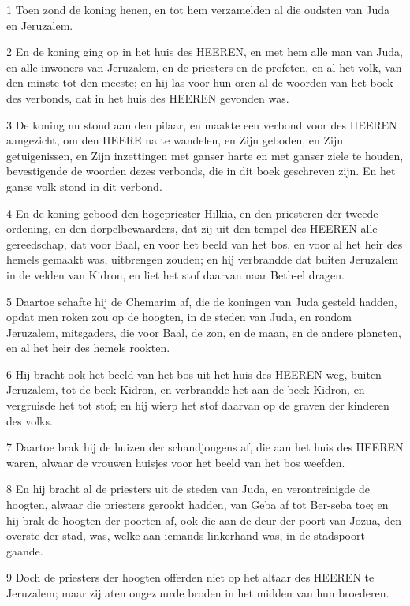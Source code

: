 \par 1 Toen zond de koning henen, en tot hem verzamelden al die oudsten van Juda en Jeruzalem.
\par 2 En de koning ging op in het huis des HEEREN, en met hem alle man van Juda, en alle inwoners van Jeruzalem, en de priesters en de profeten, en al het volk, van den minste tot den meeste; en hij las voor hun oren al de woorden van het boek des verbonds, dat in het huis des HEEREN gevonden was.
\par 3 De koning nu stond aan den pilaar, en maakte een verbond voor des HEEREN aangezicht, om den HEERE na te wandelen, en Zijn geboden, en Zijn getuigenissen, en Zijn inzettingen met ganser harte en met ganser ziele te houden, bevestigende de woorden dezes verbonds, die in dit boek geschreven zijn. En het ganse volk stond in dit verbond.
\par 4 En de koning gebood den hogepriester Hilkia, en den priesteren der tweede ordening, en den dorpelbewaarders, dat zij uit den tempel des HEEREN alle gereedschap, dat voor Baal, en voor het beeld van het bos, en voor al het heir des hemels gemaakt was, uitbrengen zouden; en hij verbrandde dat buiten Jeruzalem in de velden van Kidron, en liet het stof daarvan naar Beth-el dragen.
\par 5 Daartoe schafte hij de Chemarim af, die de koningen van Juda gesteld hadden, opdat men roken zou op de hoogten, in de steden van Juda, en rondom Jeruzalem, mitsgaders, die voor Baal, de zon, en de maan, en de andere planeten, en al het heir des hemels rookten.
\par 6 Hij bracht ook het beeld van het bos uit het huis des HEEREN weg, buiten Jeruzalem, tot de beek Kidron, en verbrandde het aan de beek Kidron, en vergruisde het tot stof; en hij wierp het stof daarvan op de graven der kinderen des volks.
\par 7 Daartoe brak hij de huizen der schandjongens af, die aan het huis des HEEREN waren, alwaar de vrouwen huisjes voor het beeld van het bos weefden.
\par 8 En hij bracht al de priesters uit de steden van Juda, en verontreinigde de hoogten, alwaar die priesters gerookt hadden, van Geba af tot Ber-seba toe; en hij brak de hoogten der poorten af, ook die aan de deur der poort van Jozua, den overste der stad, was, welke aan iemands linkerhand was, in de stadspoort gaande.
\par 9 Doch de priesters der hoogten offerden niet op het altaar des HEEREN te Jeruzalem; maar zij aten ongezuurde broden in het midden van hun broederen.
